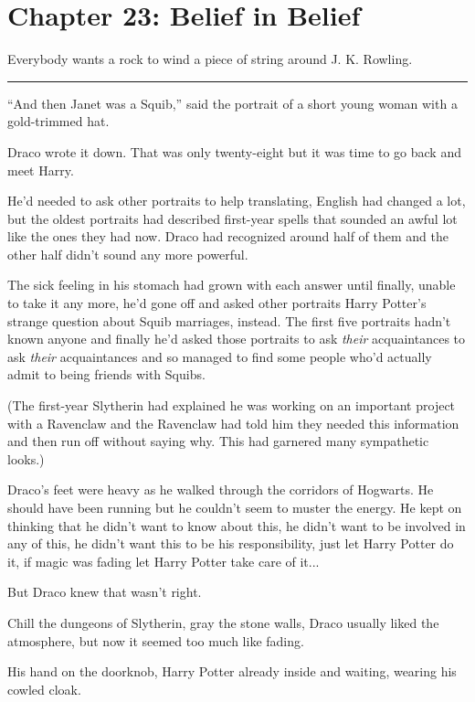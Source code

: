 \chapter{Chapter 23: Belief in Belief}
Everybody wants a rock to wind a piece of string around J. K. Rowling.

\begin{center}\rule{3in}{0.4pt}\end{center}

``And then Janet was a Squib,'' said the portrait of a short young woman
with a gold-trimmed hat.

Draco wrote it down. That was only twenty-eight but it was time to go
back and meet Harry.

He'd needed to ask other portraits to help translating, English had
changed a lot, but the oldest portraits had described first-year spells
that sounded an awful lot like the ones they had now. Draco had
recognized around half of them and the other half didn't sound any more
powerful.

The sick feeling in his stomach had grown with each answer until
finally, unable to take it any more, he'd gone off and asked other
portraits Harry Potter's strange question about Squib marriages,
instead. The first five portraits hadn't known anyone and finally he'd
asked those portraits to ask \emph{their} acquaintances to ask
\emph{their} acquaintances and so managed to find some people who'd
actually admit to being friends with Squibs.

(The first-year Slytherin had explained he was working on an important
project with a Ravenclaw and the Ravenclaw had told him they needed this
information and then run off without saying why. This had garnered many
sympathetic looks.)

Draco's feet were heavy as he walked through the corridors of Hogwarts.
He should have been running but he couldn't seem to muster the energy.
He kept on thinking that he didn't want to know about this, he didn't
want to be involved in any of this, he didn't want this to be his
responsibility, just let Harry Potter do it, if magic was fading let
Harry Potter take care of it...

But Draco knew that wasn't right.

Chill the dungeons of Slytherin, gray the stone walls, Draco usually
liked the atmosphere, but now it seemed too much like fading.

His hand on the doorknob, Harry Potter already inside and waiting,
wearing his cowled cloak.

